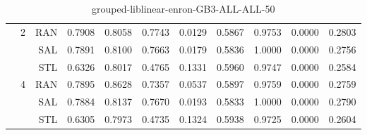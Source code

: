 \begin{center}
\begin{table}[htbp]
\begin{tabular}{ | r | r | r | r | r | r | r | r | r | r | r |}
 & \multirow{3}{*}{2} & RAN & 0.7908 & 0.8058 & 0.7743 & 0.0129 & 0.5867 & 0.9753 & 0.0000 & 0.2803\\ \cline{3-11}
 &   & SAL & 0.7891 & 0.8100 & 0.7663 & 0.0179 & 0.5836 & 1.0000 & 0.0000 & 0.2756\\ \cline{3-11}
 &   & STL & 0.6326 & 0.8017 & 0.4765 & 0.1331 & 0.5960 & 0.9747 & 0.0000 & 0.2584\\ \cline{2-11}
 & \multirow{3}{*}{4} & RAN & 0.7895 & 0.8628 & 0.7357 & 0.0537 & 0.5897 & 0.9759 & 0.0000 & 0.2759\\ \cline{3-11}
 &   & SAL & 0.7884 & 0.8137 & 0.7670 & 0.0193 & 0.5833 & 1.0000 & 0.0000 & 0.2790\\ \cline{3-11}
 &   & STL & 0.6305 & 0.7973 & 0.4735 & 0.1324 & 0.5938 & 0.9725 & 0.0000 & 0.2604\\ \cline{2-11}
\hline
\end{tabular}
\caption{grouped-liblinear-enron-GB3-ALL-ALL-50}
\end{table}
\end{center}

